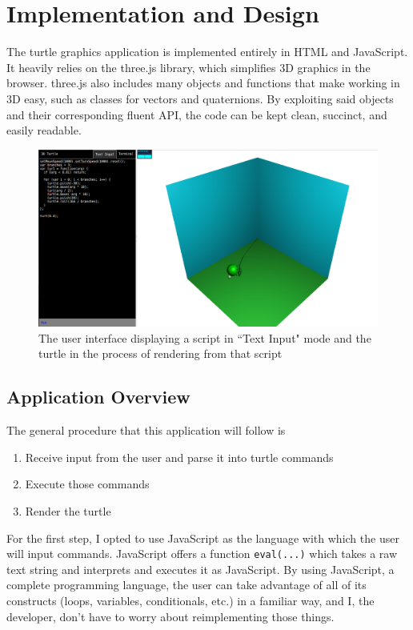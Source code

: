 \documentclass[12pt]{article}
\begin{document}
\section{Implementation and Design}

The turtle graphics application is implemented entirely in HTML and JavaScript. It heavily relies on the three.js library, which simplifies 3D graphics in the browser. three.js also includes many objects and functions that make working in 3D easy, such as classes for vectors and quaternions. By exploiting said objects and their corresponding fluent API, the code can be kept clean, succinct, and easily readable.

\begin{figure}[h]
\includegraphics[width=\textwidth]{interface}
\caption{The user interface displaying a script in ``Text Input" mode and the turtle in the process of rendering from that script}
\end{figure}

\subsection{Application Overview}

The general procedure that this application will follow is

\begin{enumerate}
\item Receive input from the user and parse it into turtle commands
\item Execute those commands
\item Render the turtle
\end{enumerate}

For the first step, I opted to use JavaScript as the language with which the user will input commands. JavaScript offers a function \texttt{eval(...)} which takes a raw text string and interprets and executes it as JavaScript. By using JavaScript, a complete programming language, the user can take advantage of all of its constructs (loops, variables, conditionals, etc.) in a familiar way, and I, the developer, don't have to worry about reimplementing those things.
\end{document}
